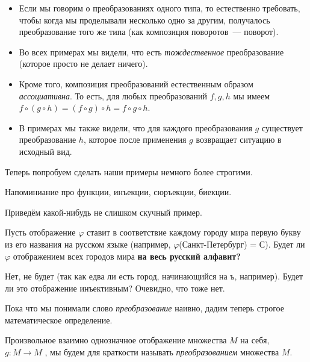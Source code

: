 	\begin{itemize}
		\item Если мы говорим о преобразованиях одного типа, то естественно требовать, чтобы когда мы проделывали несколько одно за другим, получалось преобразование того же типа (как композиция поворотов~--- поворот). 

		\item Во всех примерах мы видели, что есть \emph{тождественное} преобразование (которое просто не делает ничего). 

		\item Кроме того, композиция преобразований естественным образом \emph{ассоциативна}. То есть, для любых преобразований $f, g, h$ мы имеем $f \circ (g \circ h) = (f \circ g) \circ h = f \circ g \circ h$. 

		\item В примерах мы также видели, что для каждого преобразования $g$ существует преобразование $h$, которое после применения $g$ возвращает ситуацию в исходный вид. 
	\end{itemize}

	Теперь попробуем сделать наши примеры немного более строгими. 

	\begin{definition} 
		Напоминиание про функции, инъекции, сюръекции, биекции. 
	\end{definition}

	Приведём какой-нибудь не слишком скучный пример. 

	\begin{example}
		Пусть отображение $\varphi$ ставит в соответствие каждому городу мира первую букву из его названия на русском языке (например, $\varphi$(Санкт-Петербург) = С). Будет ли $\varphi$ отображением всех городов мира \bf{на} весь русский алфавит?

		Нет, не будет (так как едва ли есть город, начинающийся на ъ, например). Будет ли это отображение инъективным? Очевидно, что тоже нет. 
	\end{example}

	Пока что мы понимали слово \emph{преобразование} наивно, дадим теперь строгое математическое определение. 

	\begin{definition} 
		Произвольное взаимно однозначное отображение множества $M$ на себя, $g\colon M \to M$ , мы будем для краткости называть \emph{преобразованием} множества $M$.
	\end{definition}

